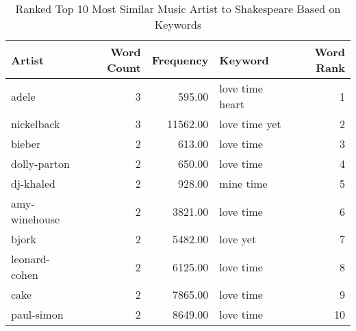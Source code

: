 \begin{table}[ht]
\centering
\begin{tabular}{lrrlr}
  \hline
Artist & Word Count & Frequency & Keyword & Word Rank \\ 
  \hline
adele &   3 & 595.00 &  love time heart &   1 \\ 
  nickelback &   3 & 11562.00 &  love time yet &   2 \\ 
  bieber &   2 & 613.00 &  love time &   3 \\ 
  dolly-parton &   2 & 650.00 &  love time &   4 \\ 
  dj-khaled &   2 & 928.00 &  mine time &   5 \\ 
  amy-winehouse &   2 & 3821.00 &  love time &   6 \\ 
  bjork &   2 & 5482.00 &  love yet &   7 \\ 
  leonard-cohen &   2 & 6125.00 &  love time &   8 \\ 
  cake &   2 & 7865.00 &  love time &   9 \\ 
  paul-simon &   2 & 8649.00 &  love time &  10 \\ 
   \hline
\end{tabular}
\caption{Ranked Top 10 Most Similar Music Artist to Shakespeare Based on Keywords} 
\label{tab:wordranktable}
\end{table}

